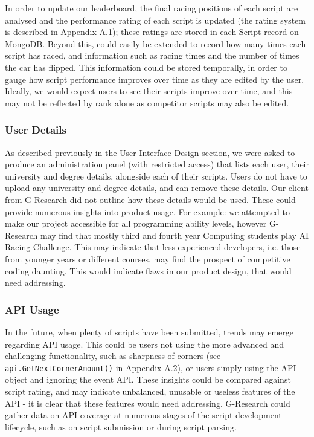 In order to update our leaderboard, the final racing positions of each script are analysed and the performance rating of each script is updated (the rating system is described in Appendix A.1); these ratings are stored in each Script record on MongoDB. Beyond this, \project could easily be extended to record how many times each script has raced, and information such as racing times and the number of times the car has flipped. This information could be stored temporally, in order to gauge how script performance improves over time as they are edited by the user. Ideally, we would expect users to see their scripts improve over time, and this may not be reflected by rank alone as competitor scripts may also be edited. 

\subsubsection{User Details}

As described previously in the User Interface Design section, we were asked to produce an administration panel (with restricted access) that lists each user, their university and degree details, alongside each of their scripts. Users do not have to upload any university and degree details, and can remove these details. Our client from G-Research did not outline how these details would be used. These could provide numerous insights into product usage. For example: we attempted to make our project accessible for all programming ability levels, however G-Research may find that mostly third and fourth year Computing students play AI Racing Challenge. This may indicate that less experienced developers, i.e. those from younger years or different courses, may find the prospect of competitive coding daunting. This would indicate flaws in our product design, that would need addressing.

\subsubsection{API Usage}

In the future, when plenty of scripts have been submitted, trends may emerge regarding API usage. This could be users not using the more advanced and challenging functionality, such as sharpness of corners (see {\tt api.GetNextCornerAmount()} in Appendix A.2), or users simply using the API object and ignoring the event API. These insights could be compared against script rating, and may indicate unbalanced, unusable or useless features of the API - it is clear that these features would need addressing. G-Research could gather data on API coverage at numerous stages of the script development lifecycle, such as on script submission or during script parsing.

